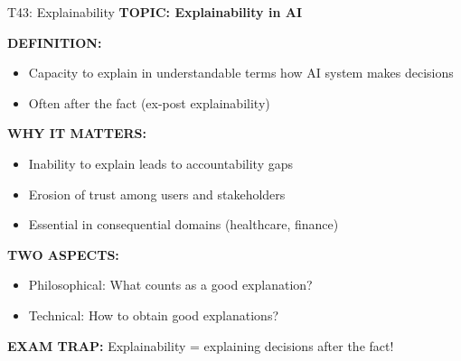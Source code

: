 \documentclass[8pt]{beamer}
\begin{document}
	\begin{frame}{T43: Explainability}
		\fontsize{6.5}{7.5}\selectfont
		\textbf{TOPIC: Explainability in AI}
		
		\vspace{0.1cm}
		\textbf{DEFINITION:}
		\begin{itemize}
			\item Capacity to explain in understandable terms how AI system makes decisions
			\item Often after the fact (ex-post explainability)
		\end{itemize}
		
		\vspace{0.1cm}
		\textbf{WHY IT MATTERS:}
		\begin{itemize}
			\item Inability to explain leads to accountability gaps
			\item Erosion of trust among users and stakeholders
			\item Essential in consequential domains (healthcare, finance)
		\end{itemize}
		
		\vspace{0.1cm}
		\textbf{TWO ASPECTS:}
		\begin{itemize}
			\item \textcolor{myblue}{Philosophical:} What counts as a good explanation?
			\item \textcolor{myblue}{Technical:} How to obtain good explanations?
		\end{itemize}
		
		\textcolor{myred}{\textbf{EXAM TRAP:}} Explainability = \textcolor{myblue}{explaining decisions after the fact}!
	\end{frame}
	
\end{document}
